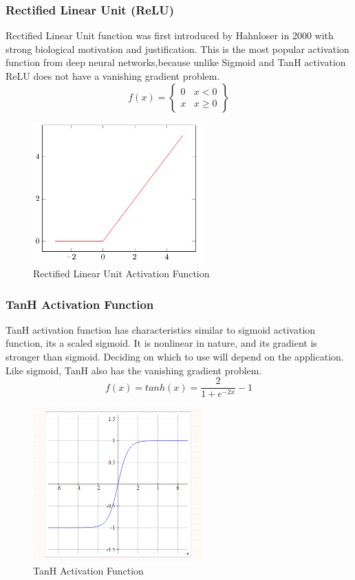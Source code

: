 \documentclass[12pt, a4paper]{report}
\begin{document}
\subsubsection{Rectified Linear Unit (ReLU)}\label{sec:ReLU}
Rectified Linear Unit function was first introduced by Hahnloser in 2000  with strong biological motivation and justification. This is the most popular activation function from deep neural networks,because unlike Sigmoid and TanH activation ReLU does not have a vanishing gradient problem\cite{ReLU}.\\
\begin{equation}\label{eq:ReLU}
f(x) = \begin{Bmatrix}
0 & x < 0 \\ 
x & x \geq 0 
\end{Bmatrix}
\end{equation}
\begin{figure}[h]
\centering
\includegraphics[width=6.5cm]{relu.png}
\caption{Rectified Linear Unit Activation Function}
\label{fig:ReLU}
\end{figure} 

\subsubsection{TanH Activation Function}\label{sec:tanh}
TanH activation function has characteristics similar to sigmoid activation function, its a scaled sigmoid. It is nonlinear in nature, and its gradient is stronger than sigmoid. Deciding on which to use will depend on the application. Like sigmoid, TanH also has the vanishing gradient problem.
\begin{equation}\label{eq:tanh}
f(x) = tanh(x)=\frac{2}{1+e^{-2x}} -1
\end{equation}
\begin{figure}[h]
\centering
\includegraphics[width=6.5cm]{tanh.png}
\caption{TanH Activation Function}
\label{fig:tanh}
\end{figure} 
\end{document}
